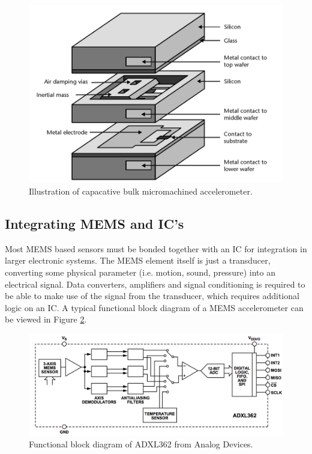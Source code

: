 \begin{figure}[h]
\centering
\includegraphics[scale=0.25]{fig/bulk_micromachined.png}
\caption{Illustration of capacative bulk micromachined accelerometer. \cite[p.~100]{maluf04}}
\label{fig:bulk_micromachined}
\end{figure}

\subsection{Integrating MEMS and IC's}

Most MEMS based sensors must be bonded together with an IC for integration in larger electronic systems. The MEMS element itself is just a transducer, converting some physical parameter (i.e. motion, sound, pressure) into an electrical signal. Data converters, amplifiers and signal conditioning is required to be able to make use of the signal from the transducer, which requires additional logic on an IC. A typical functional block diagram of a MEMS accelerometer can be viewed in Figure \ref{fig:ADXL362_functional}. 

\begin{figure}[h]
\centering
\includegraphics[scale=0.5]{fig/ADXL362_functional_block.png}
\caption{Functional block diagram of ADXL362 from Analog Devices.}
\label{fig:ADXL362_functional}
\end{figure}

